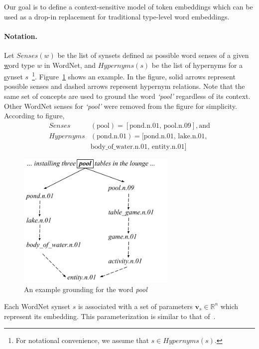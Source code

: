 Our goal is to define a context-sensitive model of token embeddings which can be used as a drop-in replacement for traditional type-level word embeddings.

\paragraph{Notation.}
Let $\textit{Senses}(w)$ be the list of synsets defined as possible word senses of a given \underline{w}ord type $w$ in WordNet, and $\textit{Hypernyms}(s)$ be the list of hypernyms for a \underline{s}ynset $s$~\footnote{For notational convenience, we assume that $s \in \textit{Hypernyms}(s)$.}. Figure~\ref{fig:ontolstm_wordnet_grounding} shows an example. In the figure, solid arrows
represent possible senses and dashed arrows represent hypernym relations. Note that the same set of concepts are used to ground the word \textit{`pool'} regardless of its context.
Other WordNet senses for \textit{`pool'} were removed from the figure for simplicity. According to figure, 
\begin{align}
\textit{Senses}&(\text{pool}) = [\text{pond.n.01, pool.n.09}], \text{and} \nonumber \\
\textit{Hypernyms}&(\text{pond.n.01}) = [\text{pond.n.01, lake.n.01}, \nonumber \\
&\text{body\_of\_water.n.01, entity.n.01}] \nonumber
\end{align}

\begin{figure}
\begin{center}
\includegraphics[width=3in]{figures/ontolstm_wordnet_grounding.png}
\caption{An example grounding for the word \textit{pool}}\label{fig:ontolstm_wordnet_grounding}
\end{center}
\end{figure}
Each WordNet synset $s$ is associated with a set of parameters $\mathbf{v}_s \in \mathbb{R}^n$ which represent its embedding. 
This parameterization is similar to that of~\cite{rothe:15}.

